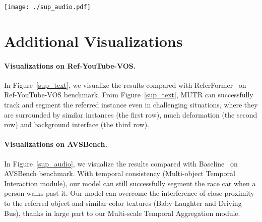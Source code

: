 \documentclass{article}
\begin{document}
\begin{figure*}[t!]
  \centering
    \texttt{[image: ./sup\_audio.pdf]}
   \caption{\textbf{Qualitative results on AVSBench between Baseline and MUTR.} }
    \label{sup_audio}
\end{figure*}


\section{Additional Visualizations}
\label{D}

\paragraph{Visualizations on Ref-YouTube-VOS.}
In Figure~\ref{sup_text}, we visualize the results compared with ReferFormer~\cite{wu2022language} on Ref-YouTube-VOS benchmark. From Figure~\ref{sup_text}, MUTR can successfully track and segment the referred instance even in challenging situations, where they are surrounded by similar instances (the first row), much deformation (the second row) and background interface (the third row).

\paragraph{Visualizations on AVSBench.} 
In Figure~\ref{sup_audio}, we visualize the results compared with Baseline~\cite{zhou2022audio} on AVSBench benchmark. With temporal consistency (Multi-object Temporal Interaction module), our model can still successfully segment the race car when a person walks past it. Our model can overcome the interference of close proximity to the referred object and similar color textures (Baby Laughter and Driving Bus), thanks in large part to our Multi-scale Temporal Aggregation module. 
\end{document}
